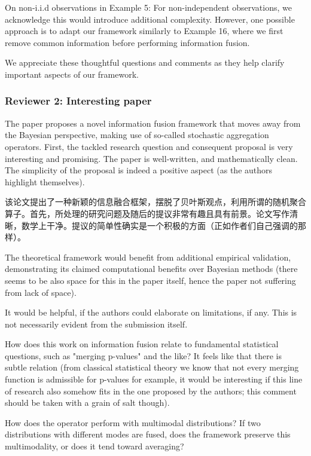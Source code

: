 \documentclass[letterpaper]{article} %
\begin{document}
\begin{CJK*}{UTF8}{gbsn}
On non-i.i.d observations in Example 5:
For non-independent observations, we acknowledge this would introduce additional complexity. However, one possible approach is to adapt our framework similarly to Example 16, where we first remove common information before performing information fusion.

We appreciate these thoughtful questions and comments as they help clarify important aspects of our framework.

\subsubsection{Reviewer 2: Interesting paper}

The paper proposes a novel information fusion framework that moves away from the Bayesian perspective, making use of so-called stochastic aggregation operators. First, the tackled research question and consequent proposal is very interesting and promising. The paper is well-written, and mathematically clean. The simplicity of the proposal is indeed a positive aspect (as the authors highlight themselves).

该论文提出了一种新颖的信息融合框架，摆脱了贝叶斯观点，利用所谓的随机聚合算子。首先，所处理的研究问题及随后的提议非常有趣且具有前景。论文写作清晰，数学上干净。提议的简单性确实是一个积极的方面（正如作者们自己强调的那样）。



The theoretical framework would benefit from additional empirical validation, demonstrating its claimed computational benefits over Bayesian methods (there seems to be also space for this in the paper itself, hence the paper not suffering from lack of space).

It would be helpful, if the authors could elaborate on limitations, if any. This is not necessarily evident from the submission itself.

How does this work on information fusion relate to fundamental statistical questions, such as "merging p-values" and the like? It feels like that there is subtle relation (from classical statistical theory we know that not every merging function is admissible for p-values for example, it would be interesting if this line of research also somehow fits in the one proposed by the authors; this comment should be taken with a grain of salt though).

How does the operator perform with multimodal distributions? If two distributions with different modes are fused, does the framework preserve this multimodality, or does it tend toward averaging?


\end{CJK*}
\end{document}
